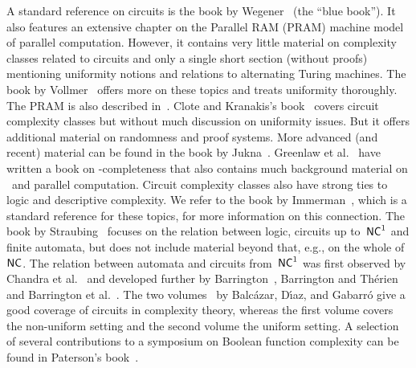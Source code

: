 A standard reference on circuits is the book by Wegener~\cite{Wegener87} (the ``blue book''). It also features an extensive chapter
on the Parallel RAM (PRAM) machine model of parallel computation. 
However, it contains very little material on complexity classes related to circuits and only a single short section (without proofs) mentioning uniformity notions and relations
to alternating Turing machines.
The book by Vollmer~\cite{Vollmer99} offers more on these topics and treats uniformity thoroughly.
The PRAM is also described in~\cite{DBLP:conf/stoc/FortuneW78,JaJa1992_IntroductionToParallelAlgorithms}.
Clote and Kranakis's book~\cite{DBLP:series/txtcs/CloteK02} covers circuit complexity classes but without much discussion on uniformity issues.
But it offers additional material on randomness and proof systems.
More advanced (and recent) material can be found in the book by Jukna~\cite{DBLP:books/daglib/0028687}.
Greenlaw et al.~\cite{GreenlawHooverRuzzo95} have written a book on \PTIME-completeness that also contains
much background material on \NC\  and parallel computation. Circuit complexity classes also have strong ties to logic and descriptive complexity.
We refer to the book by Immerman~\cite{DBLP:books/daglib/0095988}, which is a standard reference for these topics,
for more information on this connection.
The book by Straubing~\cite{Straubing94} focuses on the relation between logic, circuits up to~$\textup{\textsf{NC}}^1$ and finite automata, but does not include material beyond that, e.g., on the whole of~$\textup{\textsf{NC}}$.
The relation between automata and circuits from~$\textup{\textsf{NC}}^1$
was first observed by Chandra et al.~\cite{ChandraFortuneLipton1985_UnboundedFanInAssociativeFunctions}
and developed further by Barrington~\cite{DBLP:journals/jcss/Barrington89}, Barrington and Th\'erien~\cite{DBLP:journals/jacm/BarringtonT88}
and Barrington et al.~\cite{DBLP:journals/jcss/BarringtonCST92}.
The two volumes~\cite{DBLP:series/eatcs/BalcazarDG90,DBLP:series/txtcs/BalcazarDG95}
by Balc{\'{a}}zar,
D{\'{\i}}az, and Gabarr{\'{o}}
give a good coverage of circuits in complexity theory, whereas the first volume
covers the non-uniform setting and the second volume the uniform setting.
A selection of several contributions to a symposium
on Boolean function complexity can be found in Paterson's book~\cite{Paterson1992}.